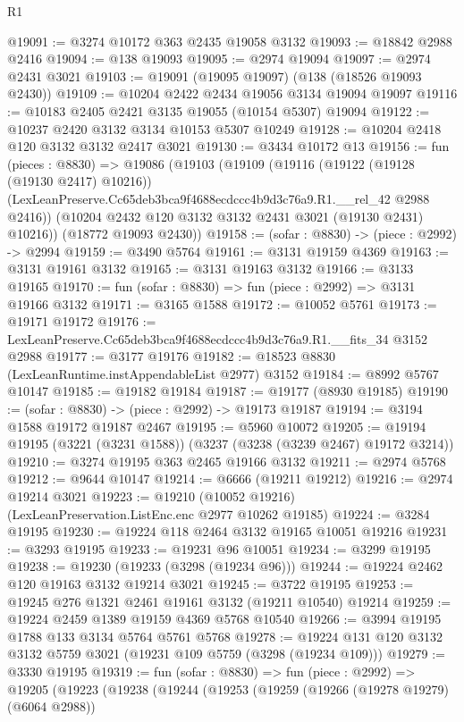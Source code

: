 \begin{lexlean}{R1}
\begin{coremodule}
@19091 := @3274 @10172 @363 @2435 @19058 @3132
@19093 := @18842 @2988 @2416
@19094 := @138 @19093
@19095 := @2974 @19094
@19097 := @2974 @2431 @3021
@19103 := @19091 (@19095 @19097) (@138 (@18526 @19093 @2430))
@19109 := @10204 @2422 @2434 @19056 @3134 @19094 @19097
@19116 := @10183 @2405 @2421 @3135 @19055 (@10154 @5307) @19094
@19122 := @10237 @2420 @3132 @3134 @10153 @5307 @10249
@19128 := @10204 @2418 @120 @3132 @3132 @2417 @3021
@19130 := @3434 @10172 @13
@19156 := fun (pieces : @8830) =>
  @19086
    (@19103
      (@19109
        (@19116
          (@19122 (@19128 (@19130 @2417) @10216))
          (LexLeanPreserve.Cc65deb3bca9f4688ecdccc4b9d3c76a9.R1.__rel_42 @2988 @2416))
        (@10204 @2432 @120 @3132 @3132 @2431 @3021 (@19130 @2431) @10216))
      (@18772 @19093 @2430))
@19158 := (sofar : @8830) -> (piece : @2992) -> @2994
@19159 := @3490 @5764
@19161 := @3131 @19159 @4369
@19163 := @3131 @19161 @3132
@19165 := @3131 @19163 @3132
@19166 := @3133 @19165
@19170 := fun (sofar : @8830) => fun (piece : @2992) => @3131 @19166 @3132
@19171 := @3165 @1588
@19172 := @10052 @5761
@19173 := @19171 @19172
@19176 := LexLeanPreserve.Cc65deb3bca9f4688ecdccc4b9d3c76a9.R1.__fits_34 @3152 @2988
@19177 := @3177 @19176
@19182 := @18523 @8830 (LexLeanRuntime.instAppendableList @2977) @3152
@19184 := @8992 @5767 @10147
@19185 := @19182 @19184
@19187 := @19177 (@8930 @19185)
@19190 := (sofar : @8830) -> (piece : @2992) -> @19173 @19187
@19194 := @3194 @1588 @19172 @19187 @2467
@19195 := @5960 @10072
@19205 := @19194 @19195 (@3221 (@3231 @1588)) (@3237 (@3238 (@3239 @2467) @19172 @3214))
@19210 := @3274 @19195 @363 @2465 @19166 @3132
@19211 := @2974 @5768
@19212 := @9644 @10147
@19214 := @6666 (@19211 @19212)
@19216 := @2974 @19214 @3021
@19223 := @19210 (@10052 @19216) (LexLeanPreservation.ListEnc.enc @2977 @10262 @19185)
@19224 := @3284 @19195
@19230 := @19224 @118 @2464 @3132 @19165 @10051 @19216
@19231 := @3293 @19195
@19233 := @19231 @96 @10051
@19234 := @3299 @19195
@19238 := @19230 (@19233 (@3298 (@19234 @96)))
@19244 := @19224 @2462 @120 @19163 @3132 @19214 @3021
@19245 := @3722 @19195
@19253 := @19245 @276 @1321 @2461 @19161 @3132 (@19211 @10540) @19214
@19259 := @19224 @2459 @1389 @19159 @4369 @5768 @10540
@19266 := @3994 @19195 @1788 @133 @3134 @5764 @5761 @5768
@19278 := @19224 @131 @120 @3132 @3132 @5759 @3021 (@19231 @109 @5759 (@3298 (@19234 @109)))
@19279 := @3330 @19195
@19319 := fun (sofar : @8830) =>
  fun (piece : @2992) =>
  @19205
    (@19223
      (@19238
        (@19244
          (@19253
            (@19259
              (@19266 (@19278 @19279) (@6064 @2988))

\end{coremodule}
\end{lexlean}
